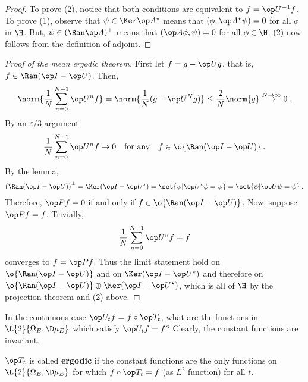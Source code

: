 \begin{proof}
    To prove (2), notice that both conditions are equivalent to $f = \op U^{-1} f$. To prove (1), observe that $\psi \in \Ker \op A^\star$ means that $(\phi, \op A^\star \psi) =0$ for all $\phi$ in $\H$. But, $\psi \in (\Ran \op A)^\bot$ means that $(\op A \phi, \psi) = 0$ for all $\phi \in \H$. (2) now follows from the definition of adjoint.
\end{proof}

\begin{proof}[Proof of the mean ergodic theorem]
    First let $f = g - \op U g$, that is, $f \in \Ran (\op I - \op U)$.
    Then, \begin{align}
        \norm{\frac{1}{N} \sum_{n=0}^{N-1} \op U^n f} = \norm{\frac{1}{N}(g - \op U^N g)} \leq \frac{2}{N} \norm{g} \overset{N \rightarrow \infty}\rightarrow 0 \:.
    \end{align}
    By an $\varepsilon/3$ argument \begin{align}
        \frac{1}{N} \sum_{n=0}^{N-1} \op U^n f \rightarrow 0 \quad \text{for any} \quad f \in \o{\Ran (\op I - \op U)} \:.
    \end{align}
    By the lemma, \begin{align}
        \left(\Ran(\op I - \op U) \right)^\bot = \Ker (\op I - \op U^\star) = \set{\psi | \op U^\star \psi = \psi} = \set{\psi | \op U \psi = \psi} \:.
    \end{align}
    Therefore, $\op P f = 0$ if and only if $f \in \o{\Ran (\op I - \op U)}$.
    Now, suppose $\op P f = f$. Trivially,
    \begin{align}
        \frac{1}{N} \sum_{n=0}^{N-1} \op U^n f = f
    \end{align}
    converges to $f = \op P f$. Thus the limit statement hold on $\o{\Ran (\op I - \op U)}$ and on $\Ker(\op I - \op U^\star)$ and therefore on $\o{\Ran (\op I - \op U)} \oplus \Ker(\op I - \op U^\star)$, which is all of $\H$ by the projection theorem and (2) above.
\end{proof}

In the continuous case $\op U_t f = f \circ \op T_t$, what are the functions in $\L{2}{\Omega_E, \D \mu_E}$ which satisfy $\op U_t f = f $? Clearly, the constant functions are invariant.

\begin{definition}
    $\op T_t$ is called \textbf{ergodic} if the constant functions are the only functions on $\L{2}{\Omega_E, \D \mu_E}$ for which $ f \circ \op T_t = f$ (as $L^2$ function) for all $t$.
\end{definition}

